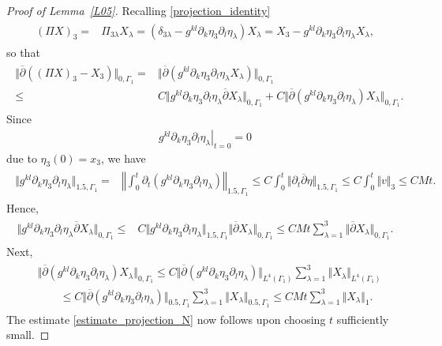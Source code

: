 \documentclass[10pt,reqno]{amsart}
\theoremstyle{plain}
\theoremstyle{definition}
\numberwithin{equation}{section}
\newcommand{\Ga}{\Gamma}
\newcommand{\de}{\delta}
\newcommand{\la}{\lambda}
\newcommand{\norm}[1]{\Vert#1\Vert}
\newcommand{\nnorm}[1]{\left\Vert#1\right\Vert}
\begin{document}
{{{\begin{proof}[Proof of Lemma~\ref{L05}]
Recalling \eqref{projection_identity}
\begin{align}
\begin{split}
(\Pi X)_3 = & \Pi_{3\la} X_\la 
=  (\de_{3\la} - g^{kl} \partial_k \eta_3 \partial_l \eta_\la ) X_\la 
= X_3 - g^{kl} \partial_k \eta_3 \partial_l \eta_\la X_\la,
\end{split}
\label{Pi_X_difference}
\end{align}
so that 
\begin{align}
\begin{split}
\norm{ \overline{\partial} ( (\Pi X)_3 - X_3 ) }_{0,\Ga_1}
= &
\norm{ 
\overline{\partial} ( g^{kl} \partial_k \eta_3 \partial_l \eta_\la X_\la )
}_{0,\Ga_1}
\\
\leq &
C \norm{ 
  g^{kl} \partial_k \eta_3 \partial_l \eta_\la  \overline{\partial}X_\la 
}_{0,\Ga_1}
+
C \norm{ 
 \overline{\partial}(  g^{kl} \partial_k \eta_3 \partial_l \eta_\la) X_\la 
}_{0,\Ga_1}.
\end{split}
\nonumber
\end{align}
Since
\begin{gather}
\left. g^{kl} \partial_k \eta_3 \partial_l \eta_\la \right|_{t=0} = 0
\label{eta_3_zero_time_zero}
\end{gather}
due to $\eta_3(0) = x_3$, we have 
\begin{align}
\begin{split}
\norm{ g^{kl} \partial_k \eta_3 \partial_l \eta_\la }_{1.5,\Ga_1}
= &\nnorm{ \int_{0}^{t}\partial_t (g^{kl} \partial_k \eta_3 \partial_l \eta_\la ) }_{1.5,\Ga_1}
\leq  C \int_0^t \norm{ \partial_t \overline{\partial} \eta}_{1.5,\Ga_1}
\leq  C \int_0^t \norm{v}_3
\leq  CM t.
\end{split}
\nonumber
\end{align}
Hence,
\begin{align}
\begin{split}
\norm{ 
  g^{kl} \partial_k \eta_3 \partial_l \eta_\la  \overline{\partial}X_\la 
}_{0,\Ga_1} \leq &
C \norm{ 
  g^{kl} \partial_k \eta_3 \partial_l \eta_\la 
}_{1.5,\Ga_1} \norm{  \overline{\partial}X_\la  }_{0,\Ga_1} 
\leq  C M t \sum_{\la=1}^3 \norm{  \overline{\partial}X_\la  }_{0,\Ga_1} .
\end{split}
\nonumber
\end{align}
Next,
\begin{align}
\begin{split}
&\norm{ 
 \overline{\partial}(  g^{kl} \partial_k \eta_3 \partial_l \eta_\la) X_\la 
}_{0,\Ga_1}
\leq 
C \norm{ 
 \overline{\partial}(  g^{kl} \partial_k \eta_3 \partial_l \eta_\la) 
}_{L^4(\Ga_1)}
\sum_{\la=1}^3 \norm{ X_\la }_{L^4(\Ga_1)}
\\
&
\qquad{}
\leq 
C \norm{ 
 \overline{\partial}(  g^{kl} \partial_k \eta_3 \partial_l \eta_\la) 
}_{0.5, \Ga_1}
\sum_{\la=1}^3 \norm{ X_\la }_{0.5,\Ga_1}
\leq 
CM t\sum_{\la=1}^3 \norm{ X_\la }_{1}.
\end{split}
\nonumber
\end{align}
The estimate \eqref{estimate_projection_N} now follows upon choosing $t$ sufficiently small.


\end{proof}}}}
\end{document}
